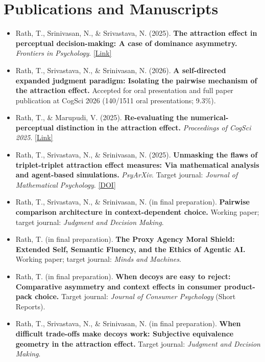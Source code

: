 \documentclass[10pt, a4paper]{extarticle}
\newcommand{\sectiontight}[1]{\vspace{6pt}\section{#1}}
\begin{document}
\newpage
\sectiontight{Publications and Manuscripts}
\begin{itemize}
  \item Rath, T., Srinivasan, N., \& Srivastava, N. (2025). \textbf{The attraction effect in perceptual decision-making: A case of dominance asymmetry.} \textit{Frontiers in Psychology}. \href{https://www.frontiersin.org/journals/psychology/articles/10.3389/fpsyg.2025.1661748}{[Link]}
  \item Rath, T., Srivastava, N., \& Srinivasan, N. (2026). \textbf{A self-directed expanded judgment paradigm: Isolating the pairwise mechanism of the attraction effect.} Accepted for oral presentation and full paper publication at CogSci 2026 (140/1511 oral presentations; 9.3\%).
  \item Rath, T., \& Marupudi, V. (2025). \textbf{Re-evaluating the numerical-perceptual distinction in the attraction effect.} \textit{Proceedings of CogSci 2025}. \href{https://escholarship.org/content/qt0t1772s5/qt0t1772s5.pdf}{[Link]}
  \item Rath, T., Srivastava, N., \& Srinivasan, N. (2025). \textbf{Unmasking the flaws of triplet-triplet attraction effect measures: Via mathematical analysis and agent-based simulations.} \textit{PsyArXiv}. Target journal: \textit{Journal of Mathematical Psychology}. \href{https://doi.org/10.31234/osf.io/cj6hu_v1}{[DOI]}
  \item Rath, T., Srivastava, N., \& Srinivasan, N. (in final preparation). \textbf{Pairwise comparison architecture in context-dependent choice.} Working paper; target journal: \textit{Judgment and Decision Making}.
  \item Rath, T. (in final preparation). \textbf{The Proxy Agency Moral Shield: Extended Self, Semantic Fluency, and the Ethics of Agentic AI.} Working paper; target journal: \textit{Minds and Machines}.
  \item Rath, T. (in final preparation). \textbf{When decoys are easy to reject: Comparative asymmetry and context effects in consumer product-pack choice.} Target journal: \textit{Journal of Consumer Psychology} (Short Reports).
  \item Rath, T., Srivastava, N., \& Srinivasan, N. (in final preparation). \textbf{When difficult trade-offs make decoys work: Subjective equivalence geometry in the attraction effect.} Target journal: \textit{Judgment and Decision Making}.
\end{itemize}
\end{document}
